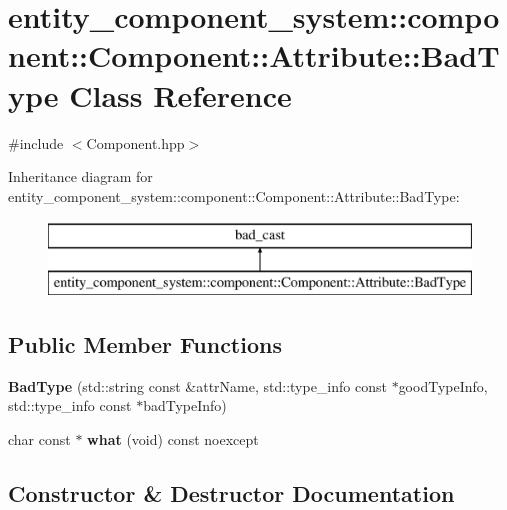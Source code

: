 \section{entity\+\_\+component\+\_\+system\+:\+:component\+:\+:Component\+:\+:Attribute\+:\+:Bad\+Type Class Reference}
\label{classentity__component__system_1_1component_1_1_component_1_1_attribute_1_1_bad_type}


{\ttfamily \#include $<$Component.\+hpp$>$}

Inheritance diagram for entity\+\_\+component\+\_\+system\+:\+:component\+:\+:Component\+:\+:Attribute\+:\+:Bad\+Type\+:\begin{figure}[H]
\begin{center}
\leavevmode
\includegraphics[height=2.000000cm]{d2/d5b/classentity__component__system_1_1component_1_1_component_1_1_attribute_1_1_bad_type}
\end{center}
\end{figure}
\subsection*{Public Member Functions}
\begin{DoxyCompactItemize}
\item 
{\bf Bad\+Type} (std\+::string const \&attr\+Name, std\+::type\+\_\+info const $\ast$good\+Type\+Info, std\+::type\+\_\+info const $\ast$bad\+Type\+Info)
\item 
char const  $\ast$ {\bf what} (void) const noexcept
\end{DoxyCompactItemize}


\subsection{Constructor \& Destructor Documentation}
\label{classentity__component__system_1_1component_1_1_component_1_1_attribute_1_1_bad_type_a7960ca3acf51ce3b53494cd62c23a93e} 
